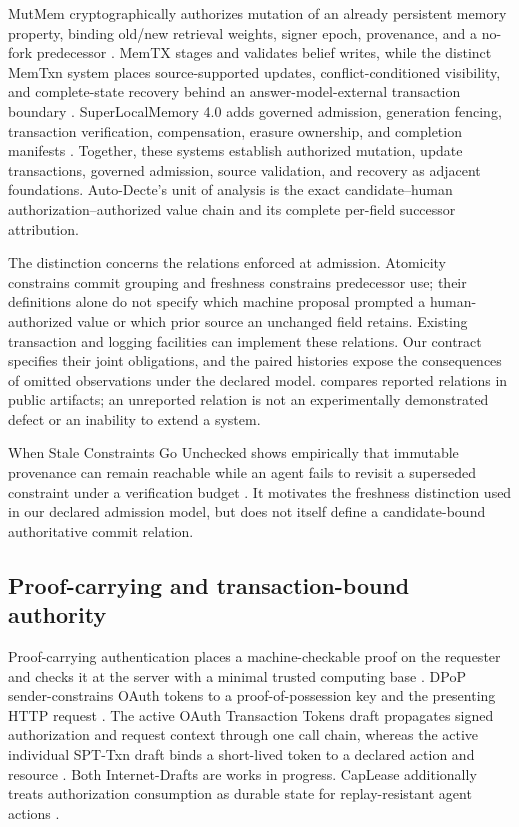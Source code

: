 MutMem cryptographically authorizes mutation of an already persistent memory property, binding old/new retrieval weights, signer epoch, provenance, and a no-fork predecessor \citep{saidi2026mutmem}. MemTX stages and validates belief writes, while the distinct MemTxn system places source-supported updates, conflict-conditioned visibility, and complete-state recovery behind an answer-model-external transaction boundary \citep{li2026memtx,cui2026memtxn}. SuperLocalMemory 4.0 adds governed admission, generation fencing, transaction verification, compensation, erasure ownership, and completion manifests \citep{bhardwaj2026superlocalmemory}. Together, these systems establish authorized mutation, update transactions, governed admission, source validation, and recovery as adjacent foundations. Auto-Decte's unit of analysis is the exact candidate--human authorization--authorized value chain and its complete per-field successor attribution.

The distinction concerns the relations enforced at admission. Atomicity constrains commit grouping and freshness constrains predecessor use; their definitions alone do not specify which machine proposal prompted a human-authorized value or which prior source an unchanged field retains. Existing transaction and logging facilities can implement these relations. Our contract specifies their joint obligations, and the paired histories expose the consequences of omitted observations under the declared model.  compares reported relations in public artifacts; an unreported relation is not an experimentally demonstrated defect or an inability to extend a system.

When Stale Constraints Go Unchecked shows empirically that immutable provenance can remain reachable while an agent fails to revisit a superseded constraint under a verification budget \citep{nakayashiki2026staleconstraints}. It motivates the freshness distinction used in our declared admission model, but does not itself define a candidate-bound authoritative commit relation.



\subsection{Proof-carrying and transaction-bound authority}

Proof-carrying authentication places a machine-checkable proof on the requester and checks it at the server with a minimal trusted computing base \citep{appel1999pca}. DPoP sender-constrains OAuth tokens to a proof-of-possession key and the presenting HTTP request \citep{fett2023dpop}. The active OAuth Transaction Tokens draft propagates signed authorization and request context through one call chain, whereas the active individual SPT-Txn draft binds a short-lived token to a declared action and resource \citep{tulshibagwale2026txtokens,coetzee2026spttxn}. Both Internet-Drafts are works in progress. CapLease additionally treats authorization consumption as durable state for replay-resistant agent actions \citep{xu2026caplease}.

